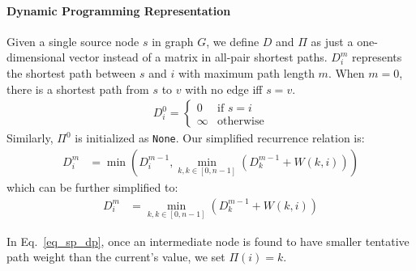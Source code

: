 \documentclass[../main.tex]{subfiles}
\begin{document}
\paragraph{Dynamic Programming Representation}
Given a single source node $s$ in graph $G$, we define $D$ and $\Pi$ as just a one-dimensional vector instead of a matrix in all-pair shortest paths. $D^{m}_i$ represents the shortest path between $s$ and $i$ with maximum path length $m$. When $m=0$, there is a shortest path from $s$ to $v$ with no edge iff $s=v$.
\begin{align}
     D^{0}_{i} = \left\{ 
    \begin{array}{ll}
   0 & \mbox{if   } s=i  \\
    \infty &\mbox{otherwise}
    \end{array}
    \right.
\label{eq_shortest_path_start}
\end{align}
Similarly, $\Pi^0$ is initialized as \texttt{None}. Our simplified recurrence relation is: 
\begin{align}
    D^{m}_{i} &= \min (D^{m-1}_{i}, \min_{k, k\in [0, n-1]}(D^{m-1}_{k}+W{(k, i)}))
\end{align}
which can be further simplified to:
\begin{align}
    D^{m}_{i} &= \min_{k, k\in [0, n-1]}(D^{m-1}_{k}+W{(k, i)})
    \label{eq_sp_dp}
\end{align}

 In Eq.~\ref{eq_sp_dp}, once an intermediate node is found to have smaller tentative path weight than the current's value,  we set $\Pi(i)=k$.
\end{document}
